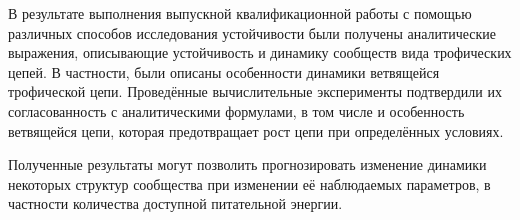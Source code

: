     В результате выполнения выпускной квалификационной работы с помощью различных способов исследования устойчивости были получены аналитические выражения, описывающие устойчивость и динамику сообществ вида трофических цепей. В частности, были описаны особенности динамики ветвящейся трофической цепи. Проведённые вычислительные эксперименты подтвердили их согласованность с аналитическими формулами, в том числе и особенность ветвящейся цепи, которая предотвращает рост цепи при определённых условиях.
    
    Полученные результаты могут позволить прогнозировать изменение динамики некоторых структур сообщества при изменении её наблюдаемых параметров, в частности количества доступной питательной энергии.
